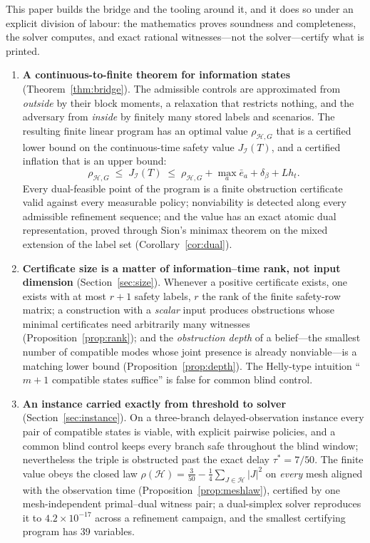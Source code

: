 \documentclass[11pt,a4paper]{article}
\theoremstyle{plain}
\theoremstyle{definition}
\theoremstyle{remark}
\newcommand{\calI}{\mathcal{I}}
\newcommand{\calH}{\mathcal{H}}
\newcommand{\J}{J_{\calI}(T)}
\newcommand{\rhoHG}{\rho_{\calH,G}}
\newcommand{\ebar}{\bar{e}}
\newcommand{\tfr}[2]{\tfrac{#1}{#2}}
\begin{document}
This paper builds the bridge and the tooling around it, and it does so under an explicit division of labour: the mathematics proves soundness and completeness, the solver computes, and exact rational witnesses---not the solver---certify what is printed.

\begin{enumerate}[leftmargin=1.6em,itemsep=2pt]
\item \textbf{A continuous-to-finite theorem for information states} (Theorem~\ref{thm:bridge}). The admissible controls are approximated from \emph{outside} by their block moments, a relaxation that restricts nothing, and the adversary from \emph{inside} by finitely many stored labels and scenarios. The resulting finite linear program has an optimal value $\rhoHG$ that is a certified lower bound on the continuous-time safety value $\J$, and a certified inflation that is an upper bound:
\[
\rhoHG\;\le\;\J\;\le\;\rhoHG+\max_a\ebar_a+\delta_\beta+Lh_t .
\]
Every dual-feasible point of the program is a finite obstruction certificate valid against every measurable policy; nonviability is detected along every admissible refinement sequence; and the value has an exact atomic dual representation, proved through Sion's minimax theorem on the mixed extension of the label set (Corollary~\ref{cor:dual}).
\item \textbf{Certificate size is a matter of information--time rank, not input dimension} (Section~\ref{sec:size}). Whenever a positive certificate exists, one exists with at most $r+1$ safety labels, $r$ the rank of the finite safety-row matrix; a construction with a \emph{scalar} input produces obstructions whose minimal certificates need arbitrarily many witnesses (Proposition~\ref{prop:rank}); and the \emph{obstruction depth} of a belief---the smallest number of compatible modes whose joint presence is already nonviable---is a matching lower bound (Proposition~\ref{prop:depth}). The Helly-type intuition ``$m+1$ compatible states suffice'' is false for common blind control.
\item \textbf{An instance carried exactly from threshold to solver} (Section~\ref{sec:instance}). On a three-branch delayed-observation instance every pair of compatible states is viable, with explicit pairwise policies, and a common blind control keeps every branch safe throughout the blind window; nevertheless the triple is obstructed past the exact delay $\tau^\ast=7/50$. The finite value obeys the closed law $\rho(\calH)=\tfr{3}{50}-\tfr14\sum_{J\in\calH}|J|^2$ on \emph{every} mesh aligned with the observation time (Proposition~\ref{prop:meshlaw}), certified by one mesh-independent primal--dual witness pair; a dual-simplex solver reproduces it to $4.2\times10^{-17}$ across a refinement campaign, and the smallest certifying program has 39 variables.

\end{enumerate}
\end{document}

